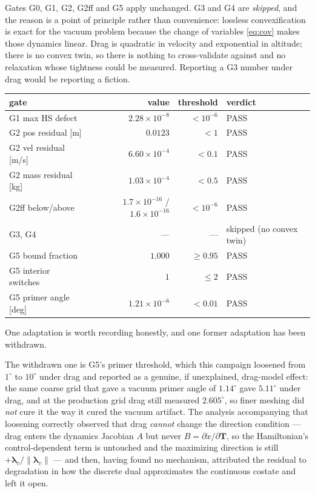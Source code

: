 \documentclass[11pt]{article}
\newcommand{\Tvec}{\mathbf{T}}
\newcommand{\lamv}{\boldsymbol{\lambda}_v}
\begin{document}
Gates G0, G1, G2, G2ff and G5 apply unchanged. G3 and G4 are \emph{skipped}, and
the reason is a point of principle rather than convenience: lossless
convexification is exact for the vacuum problem because the change of
variables \eqref{eq:cov} makes those dynamics linear. Drag is quadratic in
velocity and exponential in altitude; there is no convex twin, so there is
nothing to cross-validate against and no relaxation whose tightness could be
measured. Reporting a G3 number under drag would be reporting a fiction.

\begin{center}
{\footnotesize
\begin{tabular}{lrrl}
\toprule
gate & value & threshold & verdict \\
\midrule
G1 max HS defect        & $2.28\times10^{-8}$ & $<10^{-6}$ & PASS \\
G2 pos residual [m]     & $0.0123$ & $<1$ & PASS \\
G2 vel residual [m/s]   & $6.60\times10^{-4}$ & $<0.1$ & PASS \\
G2 mass residual [kg]   & $1.03\times10^{-4}$ & $<0.5$ & PASS \\
G2ff below/above        & $1.7\times10^{-16}$ / $1.6\times10^{-16}$ & $<10^{-6}$ & PASS \\
G3, G4                  & --- & --- & skipped (no convex twin) \\
G5 bound fraction       & $1.000$ & $\ge 0.95$ & PASS \\
G5 interior switches    & $1$ & $\le 2$ & PASS \\
G5 primer angle [deg]   & $1.21\times10^{-6}$ & $<0.01$ & PASS \\
\bottomrule
\end{tabular}}
\end{center}

One adaptation is worth recording honestly, and one former adaptation has
been withdrawn.

The withdrawn one is G5's primer threshold, which this campaign loosened
from $1^\circ$ to $10^\circ$ under drag and reported as a genuine, if
unexplained, drag-model effect: the same coarse grid that gave a vacuum
primer angle of $1.14^\circ$ gave $5.11^\circ$ under drag, and at the
production grid drag still measured $2.605^\circ$, so finer meshing did
\emph{not} cure it the way it cured the vacuum artifact. The analysis
accompanying that loosening correctly observed that drag \emph{cannot}
change the direction condition --- drag enters the dynamics Jacobian $A$ but
never $B = \partial\dot{x}/\partial\Tvec$, so the Hamiltonian's
control-dependent term is untouched and the maximizing direction is still
$+\lamv/\lVert\lamv\rVert$ --- and then, having found no mechanism,
attributed the residual to degradation in how the discrete dual approximates
the continuous costate and left it open.
\end{document}
